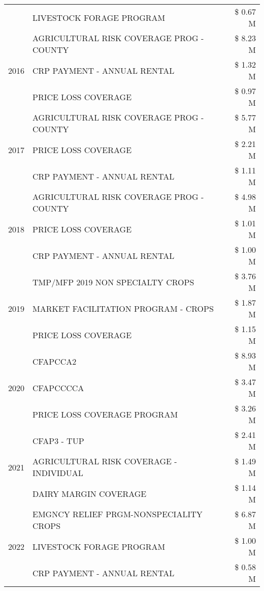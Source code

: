 \begin{tabular}{llr}
 & LIVESTOCK FORAGE PROGRAM & \$ 0.67 M \\
\cline{1-3}
\multirow[t]{3}{*}{2016} & AGRICULTURAL RISK COVERAGE PROG - COUNTY & \$ 8.23 M \\
 & CRP PAYMENT - ANNUAL RENTAL & \$ 1.32 M \\
 & PRICE LOSS COVERAGE & \$ 0.97 M \\
\cline{1-3}
\multirow[t]{3}{*}{2017} & AGRICULTURAL RISK COVERAGE PROG - COUNTY & \$ 5.77 M \\
 & PRICE LOSS COVERAGE & \$ 2.21 M \\
 & CRP PAYMENT - ANNUAL RENTAL & \$ 1.11 M \\
\cline{1-3}
\multirow[t]{3}{*}{2018} & AGRICULTURAL RISK COVERAGE PROG - COUNTY & \$ 4.98 M \\
 & PRICE LOSS COVERAGE & \$ 1.01 M \\
 & CRP PAYMENT - ANNUAL RENTAL & \$ 1.00 M \\
\cline{1-3}
\multirow[t]{3}{*}{2019} & TMP/MFP 2019 NON SPECIALTY CROPS & \$ 3.76 M \\
 & MARKET FACILITATION PROGRAM - CROPS & \$ 1.87 M \\
 & PRICE LOSS COVERAGE & \$ 1.15 M \\
\cline{1-3}
\multirow[t]{3}{*}{2020} & CFAPCCA2 & \$ 8.93 M \\
 & CFAPCCCCA & \$ 3.47 M \\
 & PRICE LOSS COVERAGE PROGRAM & \$ 3.26 M \\
\cline{1-3}
\multirow[t]{3}{*}{2021} & CFAP3 - TUP & \$ 2.41 M \\
 & AGRICULTURAL RISK COVERAGE - INDIVIDUAL & \$ 1.49 M \\
 & DAIRY MARGIN COVERAGE & \$ 1.14 M \\
\cline{1-3}
\multirow[t]{3}{*}{2022} & EMGNCY RELIEF PRGM-NONSPECIALITY CROPS & \$ 6.87 M \\
 & LIVESTOCK FORAGE PROGRAM & \$ 1.00 M \\
 & CRP PAYMENT - ANNUAL RENTAL & \$ 0.58 M \\
\cline{1-3}
\bottomrule
\end{tabular}
